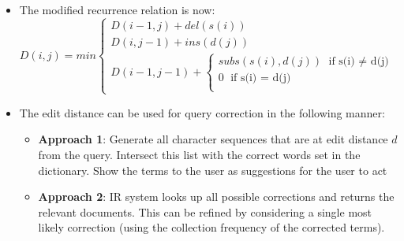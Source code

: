 \documentclass{article}
\begin{document}
\begin{itemize}
    \item The modified recurrence relation is now:
    \begin{equation*}
        D(i, j) = min \begin{cases}
            D(i-1, j) + del(s(i)) \\
            D(i, j-1) + ins(d(j)) \\
            D(i-1, j-1) + \begin{cases}
                subs(s(i), d(j)) \text{ if s(i) $\neq$ d(j)}\\
                0 \text{ if s(i) $=$ d(j)}\\
            \end{cases}
    \end{cases}
    \end{equation*}
    
    \item The edit distance can be used for query correction in the following manner:
    \begin{itemize}
        \item \textbf{Approach 1}: Generate all character sequences that are at edit distance $d$ from the query. Intersect this list with the correct words set in the dictionary. Show the terms to the user as suggestions for the user to act
        
        \item \textbf{Approach 2}: IR system looks up all possible corrections and returns the relevant documents. This can be refined by considering a single most likely correction (using the collection frequency of the corrected terms). 
    \end{itemize}
\end{itemize}
\end{document}

